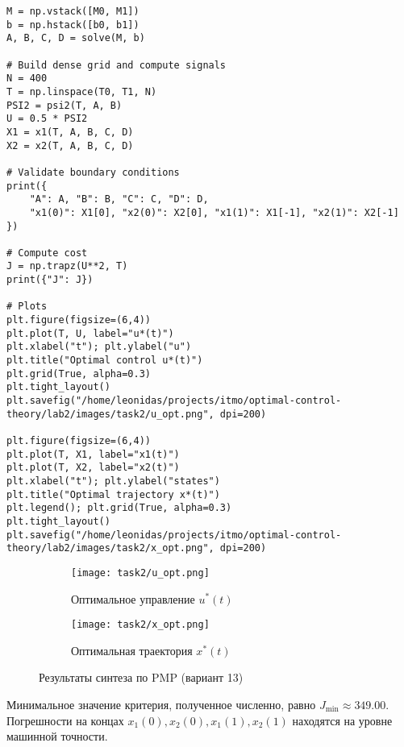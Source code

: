 \begin{lstlisting}[caption={PMP: synthesis for variant 13, validation and plots},label={lst:pmp13}]
M = np.vstack([M0, M1])
b = np.hstack([b0, b1])
A, B, C, D = solve(M, b)

# Build dense grid and compute signals
N = 400
T = np.linspace(T0, T1, N)
PSI2 = psi2(T, A, B)
U = 0.5 * PSI2
X1 = x1(T, A, B, C, D)
X2 = x2(T, A, B, C, D)

# Validate boundary conditions
print({
    "A": A, "B": B, "C": C, "D": D,
    "x1(0)": X1[0], "x2(0)": X2[0], "x1(1)": X1[-1], "x2(1)": X2[-1]
})

# Compute cost
J = np.trapz(U**2, T)
print({"J": J})

# Plots
plt.figure(figsize=(6,4))
plt.plot(T, U, label="u*(t)")
plt.xlabel("t"); plt.ylabel("u")
plt.title("Optimal control u*(t)")
plt.grid(True, alpha=0.3)
plt.tight_layout()
plt.savefig("/home/leonidas/projects/itmo/optimal-control-theory/lab2/images/task2/u_opt.png", dpi=200)

plt.figure(figsize=(6,4))
plt.plot(T, X1, label="x1(t)")
plt.plot(T, X2, label="x2(t)")
plt.xlabel("t"); plt.ylabel("states")
plt.title("Optimal trajectory x*(t)")
plt.legend(); plt.grid(True, alpha=0.3)
plt.tight_layout()
plt.savefig("/home/leonidas/projects/itmo/optimal-control-theory/lab2/images/task2/x_opt.png", dpi=200)
\end{lstlisting}

\begin{figure}[H]
    \centering
    \begin{subfigure}{0.48\textwidth}
        \texttt{[image: task2/u\_opt.png]}
        \caption{Оптимальное управление $u^*(t)$}
    \end{subfigure}\hfill
    \begin{subfigure}{0.48\textwidth}
        \texttt{[image: task2/x\_opt.png]}
        \caption{Оптимальная траектория $x^*(t)$}
    \end{subfigure}
    \caption{Результаты синтеза по PMP (вариант 13)}
    \label{fig:l2:pmp}
\end{figure}

Минимальное значение критерия, полученное численно, равно \(J_{\min}\approx 349.00\). Погрешности на концах \(x_1(0),x_2(0),x_1(1),x_2(1)\) находятся на уровне машинной точности.
